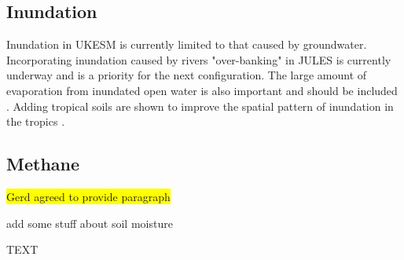 \documentclass[bg, manuscript]{copernicus}
\newcommand{\hilight}[1]{\colorbox{yellow}{#1}}
\begin{document}
\subsection{Inundation}
Inundation in UKESM is currently limited to that caused by groundwater. Incorporating inundation caused by rivers "over-banking" in JULES is currently underway  \citep{Dadson2010,Lewis2018} and is a priority for the next configuration. The large amount of evaporation from inundated open water is also important and should be included \citep{Dadson2010}. Adding tropical soils are shown to improve the spatial pattern of inundation in the tropics \citep{Gedney2019}.


\subsection{Methane}
\hilight{Gerd agreed to provide paragraph}

add some stuff about soil moisture

\conclusions  %
TEXT












\appendix
\section{}    %

\subsection{}     %
\end{document}
